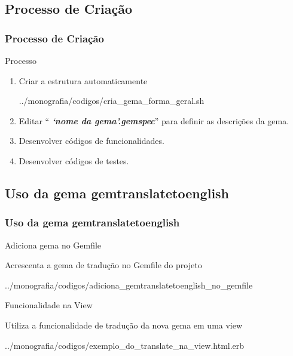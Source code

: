 \subsection{Processo de Criação}
\begin{frame}
 \frametitle{Processo de Criação}

  \begin{block}{Processo}

    \begin{enumerate}

     \item Criar a estrutura automaticamente

      
      {../monografia/codigos/cria_gema_forma_geral.sh}

     \item Editar ``\emph{\textbf{ `nome da gema'.gemspec}}'' para definir as descrições da gema.

     \item Desenvolver códigos de funcionalidades.

     \item Desenvolver códigos de testes.

    \end{enumerate}

  \end{block}

\end{frame}


\subsection{Uso da gema gemtranslatetoenglish}
\begin{frame}
 \frametitle{Uso da gema gemtranslatetoenglish}

  \begin{block}{Adiciona gema no Gemfile}

    Acrescenta a gema de tradução no Gemfile do projeto

    
    {../monografia/codigos/adiciona_gemtranslatetoenglish_no_gemfile}

  \end{block}

  \begin{block}{Funcionalidade na View}

    Utiliza a funcionalidade de tradução da nova gema em uma view

    
    {../monografia/codigos/exemplo_do_translate_na_view.html.erb}

  \end{block}

\end{frame}
